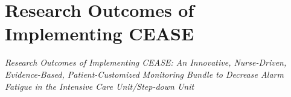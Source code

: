 \chapter{Research Outcomes of Implementing CEASE}

\textit{Research Outcomes of Implementing CEASE: An Innovative, Nurse-Driven, Evidence-Based, Patient-Customized Monitoring Bundle to Decrease Alarm Fatigue in the Intensive Care Unit/Step-down Unit}

\cite{lewis2019research}
